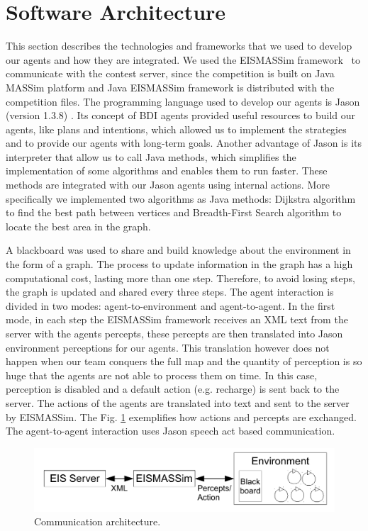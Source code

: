 \section{Software Architecture} 

This section describes the technologies and frameworks that we used to develop our agents and how they are integrated.  We used the EISMASSim framework~\cite{behrens:2011} to communicate with the contest server, since the competition is built on Java MASSim platform and Java EISMASSim framework is distributed with the competition files.  The programming language used to develop our agents is Jason (version 1.3.8) \cite{bordini:2007}. Its concept of BDI agents provided useful resources to build our agents, like plans and intentions, which allowed us to implement the strategies and to provide our agents with long-term goals. Another advantage of Jason is its interpreter that allow us to call Java methods, which simplifies the implementation of some algorithms and enables them to run faster. These methods are integrated with our Jason agents using internal actions. More specifically we implemented two algorithms as Java methods: Dijkstra algorithm to find the best path between vertices and Breadth-First Search algorithm to locate the best area in the graph.

A blackboard was used to share and build knowledge about the environment in the form of a graph. The process to update information in the graph has a high computational cost, lasting more than one step. Therefore, to avoid losing steps, the graph is updated and shared every three steps.  The agent interaction is divided in two modes: agent-to-environment and agent-to-agent. In the first mode, in each step the EISMASSim framework receives an XML text from the server with the agents percepts, these percepts are then translated into Jason environment perceptions for our agents. This translation however does not happen when our team conquers the full map and the quantity of perception is so huge that the agents are not able to process them on time. In this case, perception is disabled and a default action (e.g. recharge) is sent back to the server. The actions of the agents are translated into text and sent to the server by EISMASSim. The Fig. \ref{arqfluxo} exemplifies how actions and percepts are exchanged. The agent-to-agent interaction uses Jason speech act based communication.  

\begin{figure} 
\centering \includegraphics [width=0.9\linewidth] {./fluxo.pdf} 
\caption{Communication architecture.} \label{arqfluxo} 
\end{figure}
